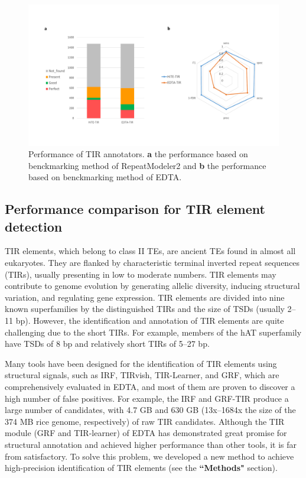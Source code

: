 \documentclass{bmcart}
\begin{document}
\begin{figure}[h!]
	\centerline{\includegraphics[width=1.0\textwidth]{figures/TIRResults.pdf}}
	\caption{Performance of TIR annotators. \textbf{a} the performance based on benckmarking method of RepeatModeler2 and \textbf{b} the performance based on benckmarking method of EDTA.}
	\label{fig:tir_results}
\end{figure}

\subsection*{Performance comparison for TIR element detection}
TIR elements, which belong to class II TEs, are ancient TEs found in almost all eukaryotes. They are flanked by characteristic terminal inverted repeat sequences (TIRs), usually presenting in low to moderate numbers\cite{wicker2007unified}. TIR elements may contribute to genome evolution by generating allelic diversity, inducing structural variation, and regulating gene expression\cite{su2019tir}. TIR elements are divided into nine known superfamilies by the distinguished TIRs and the size of TSDs (usually 2–11 bp). However, the  identification and annotation of TIR elements are quite challenging due to the short TIRs. For example, members of the hAT superfamily have TSDs of 8 bp and relatively short TIRs of 5–27 bp\cite{kempken2001hat}.

Many tools have been designed for the identification of TIR elements using structural signals, such as IRF\cite{warburton2004inverted}, TIRvish\cite{gremme2013genometools}, TIR-Learner\cite{su2019tir}, and GRF\cite{shi2019generic}, which are comprehensively evaluated in EDTA, and most of them are proven to discover a high number of false positives\cite{ou2019benchmarking}. For example, the IRF and GRF-TIR produce a large number of candidates, with 4.7 GB and 630 GB (13x–1684x the size of the 374 MB rice genome, respectively) of raw TIR candidates. Although the TIR module (GRF and TIR-learner) of EDTA has demonstrated great promise for structural annotation and achieved higher performance than other tools\cite{ou2019benchmarking}, it is far from satisfactory. To solve this problem, we developed a new method to achieve high-precision identification of TIR elements (see the \textbf{``Methods"} section).
\end{document}
